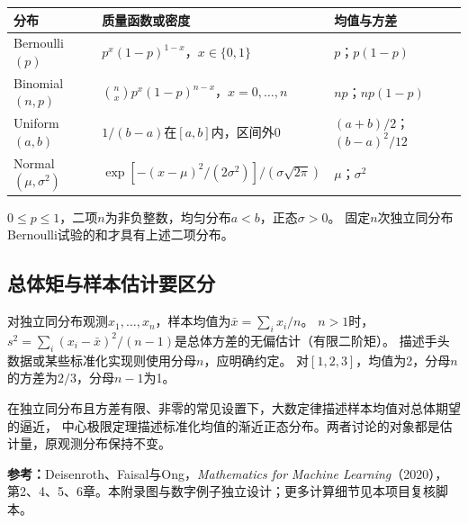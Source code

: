 \begin{center}
\begin{tabularx}{\textwidth}{P{31mm}P{67mm}Y}
\toprule
分布 & 质量函数或密度 & 均值与方差\\
\midrule
Bernoulli$(p)$ & $p^x(1-p)^{1-x}$，$x\in\{0,1\}$ & $p$；$p(1-p)$\\
Binomial$(n,p)$ & $\binom nx p^x(1-p)^{n-x}$，$x=0,\ldots,n$ & $np$；$np(1-p)$\\
Uniform$(a,b)$ & $1/(b-a)$在$[a,b]$内，区间外0 & $(a+b)/2$；$(b-a)^2/12$\\
Normal$(\mu,\sigma^2)$ & $\exp[-(x-\mu)^2/(2\sigma^2)]/(\sigma\sqrt{2\pi})$ & $\mu$；$\sigma^2$\\
\bottomrule
\end{tabularx}
\end{center}
$0\leq p\leq1$，二项$n$为非负整数，均匀分布$a<b$，正态$\sigma>0$。
固定$n$次独立同分布Bernoulli试验的和才具有上述二项分布。

\subsection{总体矩与样本估计要区分}
对独立同分布观测$x_1,\ldots,x_n$，样本均值为$\bar x=\sum_i x_i/n$。
$n>1$时，$s^2=\sum_i(x_i-\bar x)^2/(n-1)$是总体方差的无偏估计（有限二阶矩）。
描述手头数据或某些标准化实现则使用分母$n$，应明确约定。
对$[1,2,3]$，均值为2，分母$n$的方差为$2/3$，分母$n-1$为1。

在独立同分布且方差有限、非零的常见设置下，大数定律描述样本均值对总体期望的逼近，
中心极限定理描述标准化均值的渐近正态分布。两者讨论的对象都是估计量，原观测分布保持不变。




\begingroup\small
\noindent\textbf{参考：}Deisenroth、Faisal与Ong，\textit{Mathematics for Machine Learning}（2020），
第2、4、5、6章。本附录图与数字例子独立设计；更多计算细节见本项目复核脚本。
\par\endgroup
